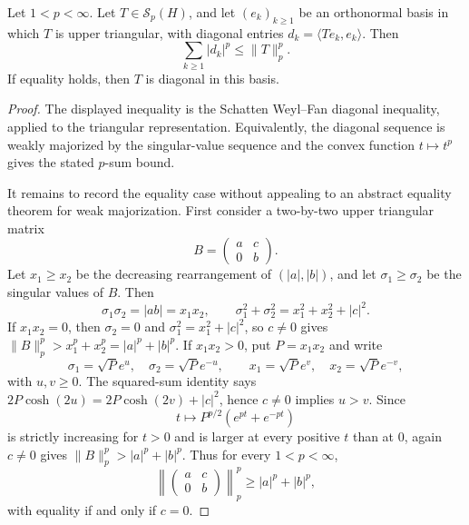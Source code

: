 \begin{lemma}
  \label{lem:schatten-triangular-equality-pinching}
  Let \(1<p<\infty\).  Let \(T\in\mathcal S_p(H)\), and let
  \((e_k)_{k\ge1}\) be an orthonormal basis in which \(T\) is upper
  triangular, with diagonal entries \(d_k=\langle Te_k,e_k\rangle\).  Then
  \[
    \sum_{k\ge1}|d_k|^p\le \|T\|_p^p.
  \]
  If equality holds, then \(T\) is diagonal in this basis.
\end{lemma}

\begin{proof}
  The displayed inequality is the Schatten Weyl--Fan diagonal inequality,
  applied to the triangular representation.  Equivalently, the diagonal
  sequence is weakly majorized by the singular-value sequence and the convex
  function \(t\mapsto t^p\) gives the stated \(p\)-sum bound.

  It remains to record the equality case without appealing to an abstract
  equality theorem for weak majorization.  First consider a two-by-two upper
  triangular matrix
  \[
    B=\begin{pmatrix}a&c\\0&b\end{pmatrix}.
  \]
  Let \(x_1\ge x_2\) be the decreasing rearrangement of \((|a|,|b|)\), and
  let \(\sigma_1\ge\sigma_2\) be the singular values of \(B\).  Then
  \[
    \sigma_1\sigma_2=|ab|=x_1x_2,
    \qquad
    \sigma_1^2+\sigma_2^2=x_1^2+x_2^2+|c|^2.
  \]
  If \(x_1x_2=0\), then \(\sigma_2=0\) and
  \(\sigma_1^2=x_1^2+|c|^2\), so \(c\ne0\) gives
  \(\|B\|_p^p>x_1^p+x_2^p=|a|^p+|b|^p\).  If \(x_1x_2>0\), put
  \(P=x_1x_2\) and write
  \[
    \sigma_1=\sqrt P e^u,
    \quad \sigma_2=\sqrt P e^{-u},
    \qquad
    x_1=\sqrt P e^v,
    \quad x_2=\sqrt P e^{-v},
  \]
  with \(u,v\ge0\).  The squared-sum identity says
  \(2P\cosh(2u)=2P\cosh(2v)+|c|^2\), hence \(c\ne0\) implies \(u>v\).
  Since
  \[
    t\longmapsto P^{p/2}(e^{pt}+e^{-pt})
  \]
  is strictly increasing for \(t>0\) and is larger at every positive
  \(t\) than at \(0\), again \(c\ne0\) gives
  \(\|B\|_p^p>|a|^p+|b|^p\).  Thus for every \(1<p<\infty\),
  \[
    \left\|\begin{pmatrix}a&c\\0&b\end{pmatrix}\right\|_p^p
    \ge |a|^p+|b|^p,
  \]
  with equality if and only if \(c=0\).


\end{proof}

